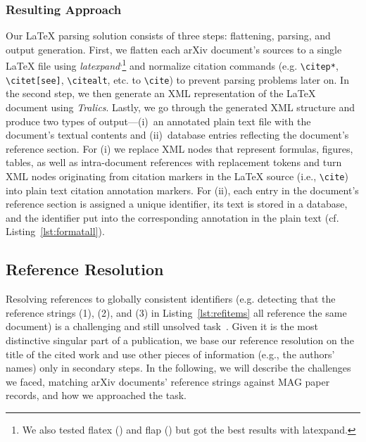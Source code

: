 \subsubsection{Resulting Approach}
Our \LaTeX{} parsing solution consists of three steps: flattening, parsing, and output generation. First, we flatten each arXiv document's sources to a single \LaTeX{} file using \textit{latexpand}\textsuperscript{,}\footnote{We also tested flatex () and flap () but got the best results with latexpand.} and normalize citation commands (e.g. \texttt{\textbackslash citep*}, \texttt{\textbackslash citet[see]}, \texttt{\textbackslash citealt}, etc. to \texttt{\textbackslash cite}) to prevent parsing problems later on. In the second step, we then generate an XML representation of the \LaTeX{} document using \textit{Tralics}. Lastly, we go through the generated XML structure and produce two types of output---(i)~an annotated plain text file with the document's textual contents and (ii)~database entries reflecting the document's reference section. For (i) we replace XML nodes that represent formulas, figures, tables, as well as intra-document references with replacement tokens and turn XML nodes originating from citation markers in the \LaTeX{} source (i.e., \texttt{\textbackslash cite}) into plain text citation annotation markers. For (ii), each entry in the document's reference section is assigned a unique identifier, its text is stored in a database, and the identifier put into the corresponding annotation in the plain text (cf. Listing~\ref{lst:formatall}).

\subsection{Reference Resolution}
\label{sec:refresol}
Resolving references to globally consistent identifiers (e.g. detecting that the reference strings (1), (2), and (3) in Listing~\ref{lst:refitems} all reference the same document) is a challenging and still unsolved task~\cite{Nasar2018}. Given it is the most distinctive singular part of a publication, we base our reference resolution on the title of the cited work and use other pieces of information (e.g., the authors' names) only in secondary steps. In the following, we will describe the challenges we faced, matching arXiv documents' reference strings against MAG paper records, and how we approached the task.

